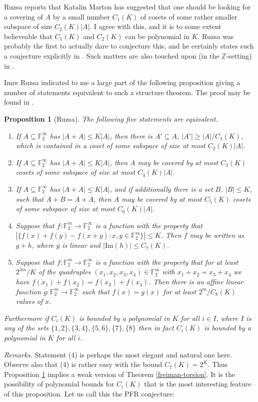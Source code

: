 \documentclass[12pt,a4paper,reqno]{amsart}
\numberwithin{equation}{section}
\theoremstyle{plain}
\newtheorem{proposition}[subsection]{Proposition}
\theoremstyle{definition}
\renewcommand{\leq}{\leqslant}
\renewcommand{\geq}{\geqslant}
\begin{document}
\noindent Ruzsa \cite{ruzsa-freimangroups} reports that Katalin Marton has suggested that one should be looking for a covering of $A$ by a small number $C_1(K)$ of cosets of some rather smaller subspace of size $C_2(K)|A|$. I agree with this, and it is to some extent believeable that $C_1(K)$ and $C_2(K)$ can be polynomial in $K$. Ruzsa was probably the first to actually dare to conjecture this, and he certainly states such a conjecture explicitly in \cite{ruzsa-survey}. Such matters are also touched upon (in the $\mathbb{Z}$-setting) in \cite{bourgain3,gowers-rough-struct}.\vspace{11pt}

\noindent Imre Ruzsa indicated to me a large part of the following proposition giving a number of statements equivalent to such a structure theorem. The proof may be found in \cite{sup-doc-2}.

\begin{proposition}[Ruzsa]\label{ruzsa-prop}
The following five statements are equivalent.
\begin{enumerate}
\item If $A \subseteq \mathbb{F}_2^{\infty}$ has $|A + A| \leq K|A|$, then there is $A' \subseteq A$, $|A'| \geq |A|/C_1(K)$, which is contained in a coset of some subspace of size at most $C_2(K)|A|$.
\item If $A \subseteq \mathbb{F}_2^{\infty}$ has $|A + A| \leq K|A|$, then $A$ may be covered by at most $C_3(K)$ cosets of some subspace of size at most $C_4(K)|A|$.
\item If $A \subseteq \mathbb{F}_2^{\infty}$ has $|A + A| \leq K|A|$, and if additionally there is a set $B$, $|B| \leq K$, such that $A + B = A + A$, then $A$ may be covered by at most $C_5(K)$ cosets of some subspace of size at most $C_6(K)|A|$.
\item Suppose that $f : \mathbb{F}_2^m \rightarrow \mathbb{F}_2^{\infty}$ is a function with the property that $|\{f(x) + f(y) - f(x+y) : x,y \in \mathbb{F}_2^m\}| \leq K$. Then $f$ may be written as $g + h$, where $g$ is linear and $|\mbox{Im}(h)| \leq C_7(K)$.
\item Suppose that $f : \mathbb{F}_2^m \rightarrow \mathbb{F}_2^{\infty}$ is a function with the property that for at least $2^{3m}/K$ of the quadruples $(x_1,x_2,x_3,x_4) \in \mathbb{F}_2^m$ with $x_1 + x_2 = x_3 + x_4$ we have $f(x_1) + f(x_2) = f(x_3) + f(x_4)$. Then there is an affine linear function $g : \mathbb{F}_2^m \rightarrow \mathbb{F}_2^{\infty}$ such that $f(x) = g(x)$ for at least $2^m/C_8(K)$ values of $x$.
\end{enumerate}
Furthermore if $C_i(K)$ is bounded by a polynomial in $K$ for all $i \in I$, where $I$ is any of the sets $\{1,2\},\{3,4\},\{5,6\},\{7\},\{8\}$ then in fact $C_i(K)$ is bounded by a polynomial in $K$ for all $i$.
\end{proposition}
\noindent\textit{Remarks.} Statement (4) is perhaps the most elegant and natural one here. Observe also that (4) is rather easy with the bound $C_7(K) = 2^K$. Thus Proposition \ref{ruzsa-prop} implies a weak version of Theorem \ref{freiman-torsion}. It is the possibility of polynomial bounds for $C_i(K)$ that is the most interesting feature of this proposition. Let us call this the PFR conjecture:
\end{document}
